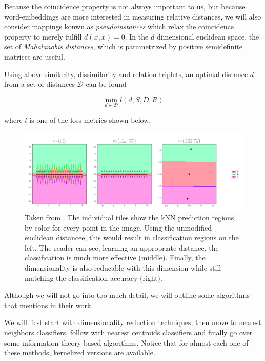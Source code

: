 \documentclass[a4paper,12pt,oneside,openright]{report}
\begin{document}
Because the coincidence property is not always important to us, but because word-embeddings are more interested in measuring relative distances, we will also consider mappings konwn as \textit{pseudoinstances} which relax the coincidence property to merely fulfill $d(x, x) = 0$.
In the $d$ dimensional euclidean space, the set of \textit{Mahalanobis distances}, which is parametrized by positive semidefinite matrices are useful.

Using above similarity, dissimilarity and relation triplets, an optimal distance $d$ from a set of distances $\mathcal{D}$ can be found

\begin{equation}
\min_{d \in \mathcal{D}} l (d, S, D, R)
\end{equation}

where $l$ is one of the loss metrics shown below.



\begin{figure}[H]
	\center
  \includegraphics[width=\linewidth]{./assets/relatedwork/metric_learning_example.png}
  \caption{Taken from \cite{suarez19}. The individual tiles show the kNN prediction regions by color for every point in the image. Using the unmodified euclidean distancee, this would result in classification regions on the left. The reader can see, learning an appropriate distance, the classification is much more effective (middle). Finally, the dimensionality is also reducable with this dimension while still matching the classification accuracy (right).}
\end{figure}

Although we will not go into too much detail, we will outline some algorithms that \cite{suarez19} mentions in their work.

We will first start with dimensionality reduction techniques, then move to nearest neighbors classifiers, follow with nearest centroids classifiers and finally go over some information theory based algorithms.
Notice that for almost each one of these methods, kernelized versions are available.
\end{document}
